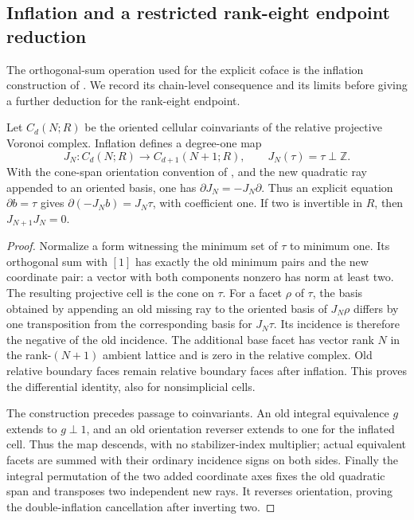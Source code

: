\subsection{Inflation and a restricted rank-eight endpoint reduction}
\label{subsec:k12-coloop-rank8}

The orthogonal-sum operation used for the explicit coface is the
inflation construction of \cite[\S6.1]{ElbazGanglSoule2013}. We record
its chain-level consequence and its limits before giving a further
deduction for the rank-eight endpoint.

\begin{lemma}
\label{lem:k12-inflation}
Let $C_d(N;R)$ be the oriented cellular coinvariants of the relative
projective Voronoi complex. Inflation defines a degree-one map
\[
 J_N:C_d(N;R)\longrightarrow C_{d+1}(N+1;R),\qquad
 J_N(\tau)=\tau\perp\mathbb Z.
\]
With the cone-span orientation convention of
\cite[\S1.2.1, equations (1)--(2)]{DEKM2026}, and the new quadratic
ray appended to an oriented basis, one has
$\partial J_N=-J_N\partial$. Thus an explicit equation
$\partial b=\tau$ gives $\partial(-J_Nb)=J_N\tau$, with coefficient
one. If two is invertible in $R$, then $J_{N+1}J_N=0$.
\end{lemma}

\begin{proof}
Normalize a form witnessing the minimum set of $\tau$ to minimum one.
Its orthogonal sum with $[1]$ has exactly the old minimum pairs and the
new coordinate pair: a vector with both components nonzero has norm
at least two. The resulting projective cell is the cone on $\tau$.
For a facet $\rho$ of $\tau$, the basis obtained by appending an old
missing ray to the oriented basis of $J_N\rho$ differs by one
transposition from the corresponding basis for $J_N\tau$.
Its incidence is therefore the negative of the old incidence.
The additional base facet has vector rank $N$ in the rank-$(N+1)$
ambient lattice and is zero in the relative complex. Old relative
boundary faces remain relative boundary faces after inflation.
This proves the differential identity, also for nonsimplicial cells.

The construction precedes passage to coinvariants. An old integral
equivalence $g$ extends to $g\perp1$, and an old orientation reverser
extends to one for the inflated cell. Thus the map descends, with no
stabilizer-index multiplier; actual equivalent facets are summed with
their ordinary incidence signs on both sides. Finally the integral
permutation of the two added coordinate axes fixes the old quadratic
span and transposes two independent new rays. It reverses orientation,
proving the double-inflation cancellation after inverting two.
\end{proof}

